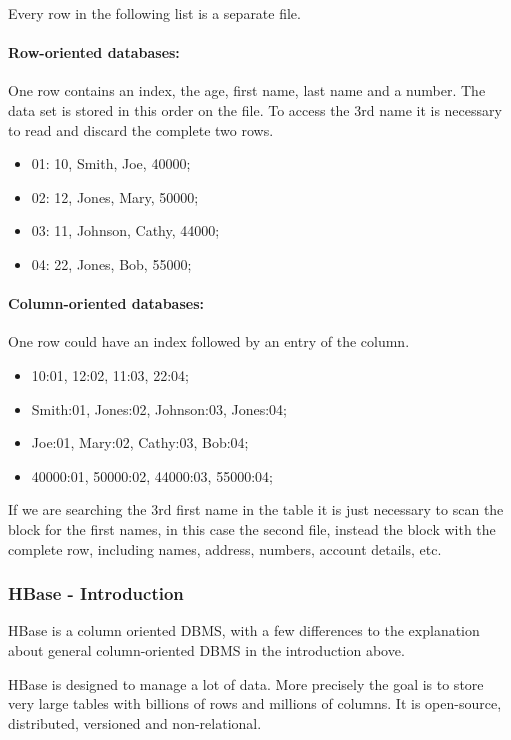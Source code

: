 Every row in the following list is a separate file.

\paragraph{Row-oriented databases:}
One row contains an index, the age, first name, last name and a number.
The data set is stored in this order on the file. 
To access the 3rd name it is necessary to read and discard the complete two rows.
\begin{itemize}
	\item 01: 10, Smith, Joe, 40000; 
	\item 02: 12, Jones, Mary, 50000; 
	\item 03: 11, Johnson, Cathy, 44000; 
	\item 04: 22, Jones, Bob, 55000;
\end{itemize}


\paragraph{Column-oriented databases:}
One row could have an index followed by an entry of the column.
\begin{itemize}
	\item 10:01, 12:02, 11:03, 22:04;
	\item Smith:01, Jones:02, Johnson:03, Jones:04;
	\item Joe:01, Mary:02, Cathy:03, Bob:04;
	\item 40000:01, 50000:02, 44000:03, 55000:04;
\end{itemize}
If we are searching the 3rd first name in the table it is just necessary to scan the block for the first names, in this case the second file, instead the block with the complete row, including names, address, numbers, account details, etc. 


\newpage
\subsubsection{HBase - Introduction}
HBase is a column oriented DBMS, with a few differences to the explanation about general column-oriented DBMS in the introduction above.

HBase is designed to manage a lot of data. 
More precisely the goal is to store very large tables with billions of rows and millions of columns.
It is open-source, distributed, versioned and non-relational.
\cite{hbase.apache.foundation.2017} \cite{hbase.hortonworks.2017}

